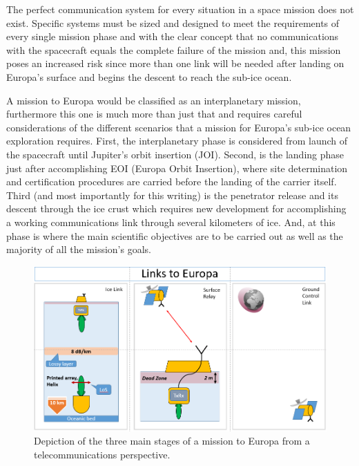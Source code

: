
The perfect communication system for every situation in a space mission does not exist. Specific systems must be sized and designed to meet the requirements of every single mission phase and with the clear concept that no communications with the spacecraft equals the complete failure of the mission and, this mission poses an increased risk since more than one link will be needed after landing on Europa's surface and begins the descent to reach the sub-ice ocean.

A mission to Europa would be classified as an interplanetary mission, furthermore this one is much more than just that and requires careful considerations of the different scenarios that a mission for Europa's sub-ice ocean exploration requires. First, the interplanetary phase is considered from launch of the spacecraft until Jupiter's orbit insertion (JOI). Second, is the landing phase just after accomplishing EOI (Europa Orbit Insertion), where site determination and certification procedures are carried before the landing of the carrier itself. Third (and most importantly for this writing) is the penetrator release and its descent through the ice crust which requires new development for accomplishing a working communications link through several kilometers of ice. And, at this phase is where the main scientific objectives are to be carried out as well as the majority of all the mission's goals.

\begin{figure}[htb]
	\centering
	\includegraphics[width=\textwidth]{figures/comms/europaLinks}
	\caption{Depiction of the three main stages of a mission to Europa from a telecommunications perspective.}
	\label{fig:europaLinks}
\end{figure}

